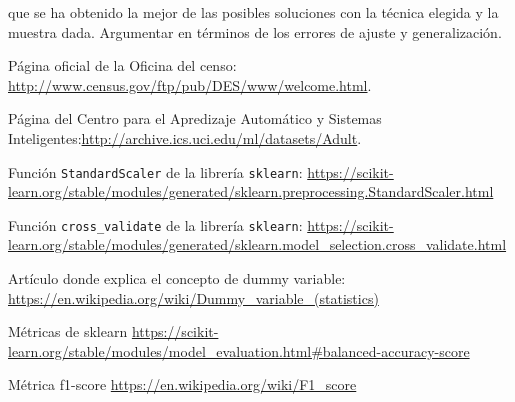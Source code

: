 \documentclass[11pt,a4paper]{article}
\begin{document}
que se ha obtenido la mejor de las posibles soluciones con la técnica elegida y la muestra dada. Argumentar en términos de los errores de ajuste y generalización. 


\newpage
\begin{thebibliography}{9}
Página oficial de la Oficina del censo: \url{http://www.census.gov/ftp/pub/DES/www/welcome.html}.

Página del Centro para el Apredizaje Automático y Sistemas Inteligentes:\url{http://archive.ics.uci.edu/ml/datasets/Adult}.

Función \texttt{StandardScaler} de la librería \texttt{sklearn}: \url{https://scikit-learn.org/stable/modules/generated/sklearn.preprocessing.StandardScaler.html}

Función \texttt{cross\_validate} de la librería \texttt{sklearn}:
\url{https://scikit-learn.org/stable/modules/generated/sklearn.model_selection.cross_validate.html}

Artículo donde explica el concepto de dummy variable: \url{https://en.wikipedia.org/wiki/Dummy_variable_(statistics)}

Métricas de sklearn \url{https://scikit-learn.org/stable/modules/model_evaluation.html#balanced-accuracy-score}


Métrica f1-score \url{https://en.wikipedia.org/wiki/F1_score}
\end{thebibliography}
\end{document}
